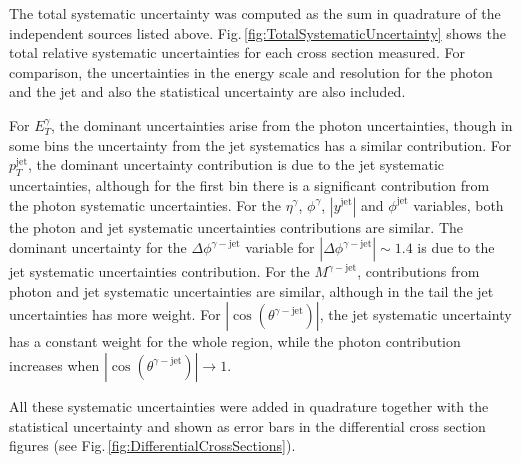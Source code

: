\documentclass[12pt, twoside]{article}
\numberwithin{equation}{section}
\numberwithin{figure}{section}
\begin{document}
The total systematic uncertainty was computed as the sum in quadrature of the independent sources listed above. Fig.\,\ref{fig:TotalSystematicUncertainty} shows the total relative systematic uncertainties for each cross section measured. For comparison, the uncertainties in the energy scale and resolution for the photon and the jet and also the statistical uncertainty are also included.

For $E^{\gamma}_{T}$, the dominant uncertainties arise from the photon uncertainties, though in some bins the uncertainty from the jet systematics has a similar contribution. For $p^{\text{jet}}_{T}$, the dominant uncertainty contribution is due to the jet systematic uncertainties, although for the first bin there is a significant contribution from the photon systematic uncertainties. For the $\eta^{\gamma}$, $\phi^{\gamma}$, $\left| y^{\text{jet}} \right|$ and $\phi^{\text{jet}}$ variables, both the photon and jet systematic uncertainties contributions are similar. The dominant uncertainty for the $\Delta \phi^{\gamma-\text{jet}}$ variable for $\left| \Delta \phi^{\gamma-\text{jet}} \right| \sim 1.4$ is due to the jet systematic uncertainties contribution. For the $M^{\gamma-\text{jet}}$, contributions from photon and jet systematic uncertainties are similar, although in the tail the jet uncertainties has more weight. For $\left| \cos \left( \theta^{\gamma-\text{jet}} \right) \right|$, the jet systematic uncertainty has a constant weight for the whole region, while the photon contribution increases when $\left| \cos \left( \theta^{\gamma-\text{jet}} \right) \right| \rightarrow 1$.

All these systematic uncertainties were added in quadrature together with the statistical uncertainty and shown as error bars in the differential cross section figures (see Fig.\,\ref{fig:DifferentialCrossSections}).
\end{document}
